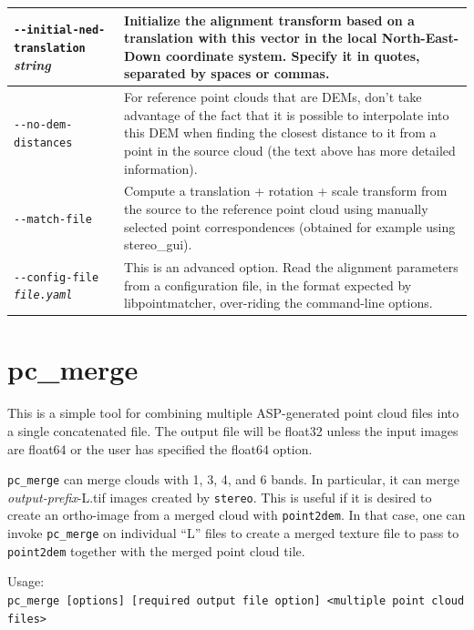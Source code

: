 \begin{longtable}{|p{8cm}|p{9cm}|}
\texttt{-\/-initial-ned-translation} \textit{string} &  Initialize the alignment transform based on a translation with this vector in the local North-East-Down coordinate system. Specify it in quotes, separated by spaces or commas. \\ \hline

\texttt{-\/-no-dem-distances} & For reference point clouds that are DEMs, don't take advantage of the fact that it is possible to interpolate into this DEM when finding the closest distance to it from a point in the source cloud (the text above has more detailed information). \\ \hline

\texttt{-\/-match-file} & Compute a translation + rotation + scale transform from the source to the reference point cloud using manually selected point correspondences (obtained for example using stereo\_gui). \\ \hline

\texttt{-\/-config-file \textit{file.yaml}} & This is an advanced
option. Read the alignment parameters from a configuration file, in the
format expected by libpointmatcher, over-riding the command-line options.\\ \hline

\end{longtable}

\section{pc\_merge}
\label{pcmerge}

This is a simple tool for combining multiple ASP-generated point cloud files into
a single concatenated file.  The output file will be float32 unless the input images
are float64 or the user has specified the float64 option.

\texttt{pc\_merge} can merge clouds with
1, 3, 4, and 6 bands. In particular, it can merge \textit{output-prefix}-L.tif images
created by \texttt{stereo}. This is useful if it is desired to create an
ortho-image from a merged cloud with \texttt{point2dem}. In that case,
one can invoke \texttt{pc\_merge} on individual ``L'' files to create a
merged texture file to pass to \texttt{point2dem} together with the
merged point cloud tile.


\medskip

Usage:\\
\hspace*{2em}\texttt{pc\_merge [options] [required output file option] <multiple point cloud files>}

